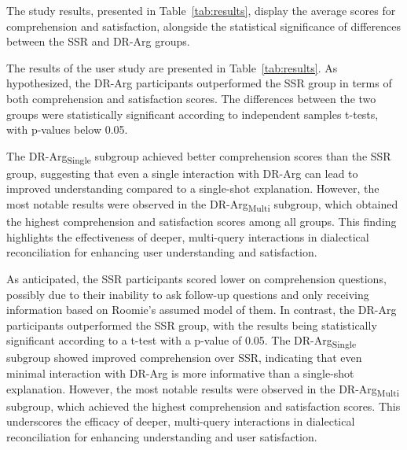 \documentclass{article}
\begin{document}
The study results, presented in Table~\ref{tab:results}, display the average scores for comprehension and satisfaction, alongside the statistical significance of differences between the SSR and DR-Arg groups.

The results of the user study are presented in Table~\ref{tab:results}. As hypothesized, the DR-Arg participants outperformed the SSR group in terms of both comprehension and satisfaction scores. The differences between the two groups were statistically significant according to independent samples t-tests, with p-values below 0.05. 

The DR-Arg\textsubscript{Single} subgroup achieved better comprehension scores than the SSR group, suggesting that even a single interaction with DR-Arg can lead to improved understanding compared to a single-shot explanation. However, the most notable results were observed in the DR-Arg\textsubscript{Multi} subgroup, which obtained the highest comprehension and satisfaction scores among all groups. This finding highlights the effectiveness of deeper, multi-query interactions in dialectical reconciliation for enhancing user understanding and satisfaction.


\begin{table}[!t]
\centering
\renewcommand{\arraystretch}{1.2}
\caption{Results of the user study.}
\label{tab:results}
\end{table}





As anticipated, the SSR participants scored lower on comprehension questions, possibly due to their inability to ask follow-up questions and only receiving information based on Roomie's assumed model of them. In contrast, the DR-Arg participants outperformed the SSR group, with the results being statistically significant according to a t-test with a p-value of 0.05. The DR-Arg\textsubscript{Single} subgroup showed improved comprehension over SSR, indicating that even minimal interaction with DR-Arg is more informative than a single-shot explanation. However, the most notable results were observed in the DR-Arg\textsubscript{Multi} subgroup, which achieved the highest comprehension and satisfaction scores.  This underscores the efficacy of deeper, multi-query interactions in dialectical reconciliation for enhancing understanding and user satisfaction. 
\end{document}
